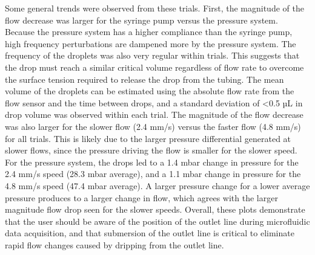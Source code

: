 \documentclass{article}
\begin{document}
Some general trends were observed from these trials. First, the magnitude of the flow decrease was larger for the syringe pump versus the pressure system. Because the pressure system has a higher compliance than the syringe pump, high frequency perturbations are dampened more by the pressure system. The frequency of the droplets was also very regular within trials. This suggests that the drop must reach a similar critical volume regardless of flow rate to overcome the surface tension required to release the drop from the tubing. The mean volume of the droplets can be estimated using the absolute flow rate from the flow sensor and the time between drops, and a standard deviation of <0.5 µL in drop volume was observed within each trial. The magnitude of the flow decrease was also larger for the slower flow (2.4 mm/s) versus the faster flow (4.8 mm/s) for all trials. This is likely due to the larger pressure differential generated at slower flows, since the pressure driving the flow is smaller for the slower speed. For the pressure system, the drops led to a 1.4 mbar change in pressure for the 2.4 mm/s speed (28.3 mbar average), and a 1.1 mbar change in pressure for the 4.8 mm/s speed (47.4 mbar average). A larger pressure change for a lower average pressure produces to a larger change in flow, which agrees with the larger magnitude flow drop seen for the slower speeds. Overall, these plots demonstrate that the user should be aware of the position of the outlet line during microfluidic data acquisition, and that submersion of the outlet line is critical to eliminate rapid flow changes caused by dripping from the outlet line.


\end{document}
